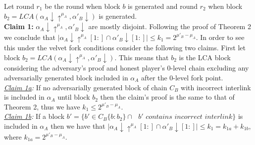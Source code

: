 \documentclass[11pt,a4paper]{article}
\begin{document}
Let round $r_1$ be the round when block $b$ is generated and round $r_2$ when block $b_2 = LCA(\alpha_A \downarrow \uparrow^{\mu_A}, \alpha'_B\downarrow)$ is generated.\\
\textbf{Claim 1:} $\alpha_A \downarrow \uparrow^{\mu_A}, \alpha'_B\downarrow$ are mostly disjoint. Following the proof of Theorem 2 we conclude that $\vert \alpha_A\downarrow\uparrow^{\mu_A}[1:] \cap \alpha'_B\downarrow[1:] \vert \leq k_{1} = 2^{\mu'_B - \mu_A}$. In order to see this under the velvet fork conditions consider the following two claims. First let block $b_2 = LCA(\alpha_A \downarrow \uparrow^{\mu_A}, \alpha'_B\downarrow)$. This means that $b_2$ is the LCA block considering the adversary's proof and honest player's 0-level chain excluding any adversarially generated block included in $\alpha_A$ after the 0-level fork point.\\
\textit{\underline{Claim 1a}:} If no adversarially generated block of chain $C_B$ with incorrect interlink is included in $\alpha_A$ until block $b_2$ then the claim's proof is the same to that of Theorem 2, thus we have $k_1 \leq 2^{\mu'_B - \mu_A}$.\\
\textit{\underline{Claim 1b}:}  If a block $b' = \{b' \in C_B\{b:b_2\} \cap \textit{ } b' \textit{ contains incorrect interlink} \}$ is included in $\alpha_A$ then we have that $\vert \alpha_A\downarrow\uparrow^{\mu_A}[1:] \cap \alpha'_B\downarrow[1:] \vert \leq k_1 = k_{1a} + k_{1b}$, where $ k_{1a} = 2^{\mu'_B - \mu_A}$. 
	
\end{document}
